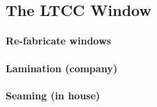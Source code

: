 \subsection{The LTCC Window}


\paragraph{Re-fabricate windows}
\paragraph{Lamination (company)}
\paragraph{Seaming (in house)}





